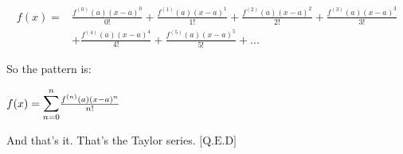 \documentclass[14pt]{extreport}
\begin{document}
\begin{align*}f(x) =&\frac{f^{(0)}(a)(x-a)^0}{0!} + \frac{f^{(1)}(a)(x-a)^1}{1!} + \frac{f^{(2)}(a)(x-a)^2}{2!} + \frac{f^{(3)}(a)(x-a)^3}{3!} \\&+ \frac{f^{(4)}(a)(x-a)^4}{4!} + \frac{f^{(5)}(a)(x-a)^5}{5!} + ...\end{align*} 
\newline
\newline

So the pattern is:

$f(x) = \mathlarger{\mathlarger{\sum}}\limits_{n = 0}^n\frac{f^{(n)}(a)(x-a)^n}{n!}$
\newline


And that's it. That's the Taylor series. 
$\text{[Q.E.D]}$
\end{document}
